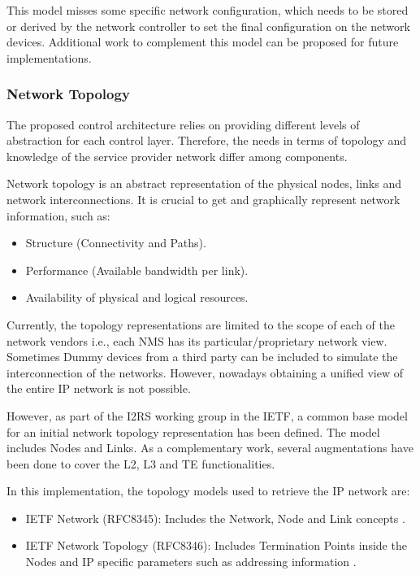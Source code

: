 \documentclass[a4paper,fleqn]{cas-dc}
\begin{document}
This model misses some specific network configuration, which needs to be stored or derived by the network controller to set the final configuration on the network devices. Additional work to complement this model can be proposed for future implementations.  

\subsubsection{Network Topology}
\label{subsection:IPtopo}

The proposed control architecture relies on providing different levels of abstraction for each control layer. Therefore, the needs in terms of topology and knowledge of the service provider network differ among components. 

Network topology is an abstract representation of the physical nodes, links and network interconnections. It is crucial to get and graphically represent network information, such as:
\begin{itemize}
    \item Structure (Connectivity and Paths).
    \item Performance (Available bandwidth per link).
    \item Availability of physical and logical resources.
\end{itemize}

Currently, the topology representations are limited to the scope of each of the network vendors i.e., each NMS has its particular/proprietary network view. Sometimes Dummy devices from a third party can be included to simulate the interconnection of the networks. However, nowadays obtaining a unified view of the entire IP network is not possible.

However, as part of the I2RS working group in the IETF, a common base model for an initial network topology representation has been defined. The model includes Nodes and Links. As a complementary work, several augmentations have been done to cover the L2, L3 and TE functionalities.

In this implementation, the topology models used to retrieve the IP network are: 
\begin{itemize}
\item IETF Network (RFC8345): Includes the Network, Node and Link concepts \cite{clemm2018yang}.
\item IETF Network Topology (RFC8346): Includes Termination Points inside the Nodes and IP specific parameters such as addressing information \cite{varga2018internet}.
\end{itemize}
\end{document}
